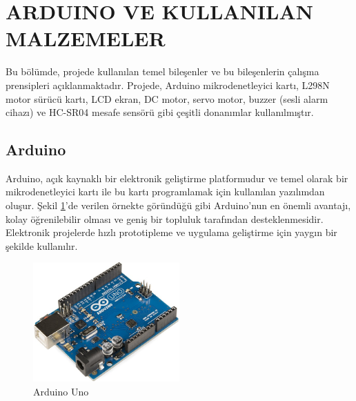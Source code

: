 \section{ARDUINO VE KULLANILAN MALZEMELER}
    Bu bölümde, projede kullanılan temel bileşenler ve bu bileşenlerin çalışma prensipleri açıklanmaktadır. Projede, Arduino mikrodenetleyici kartı, L298N motor sürücü kartı, LCD ekran, DC motor, servo motor, buzzer (sesli alarm cihazı) ve HC-SR04 mesafe sensörü gibi çeşitli donanımlar kullanılmıştır.

\subsection{Arduino}

    Arduino, açık kaynaklı bir elektronik geliştirme platformudur ve temel olarak bir mikrodenetleyici kartı ile bu kartı programlamak için kullanılan yazılımdan oluşur. Şekil \ref{fig:3}'de verilen örnekte göründüğü gibi Arduino'nun en önemli avantajı, kolay öğrenilebilir olması ve geniş bir topluluk tarafından desteklenmesidir. Elektronik projelerde hızlı prototipleme ve uygulama geliştirme için yaygın bir şekilde kullanılır.
    
\begin{figure}[H]
\centering
\includegraphics[width=0.50\textwidth]{Resimler/3}
\caption{Arduino Uno}
\label{fig:3}
\end{figure}
